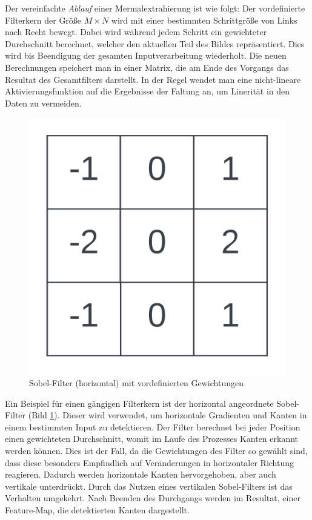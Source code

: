 Der vereinfachte \textit{Ablauf} einer Mermalextrahierung ist wie folgt: Der vordefinierte Filterkern der Größe $M \times N$ wird mit einer bestimmten Schrittgröße von Links nach Recht bewegt. Dabei wird während jedem Schritt ein gewichteter Durchschnitt berechnet, welcher den aktuellen Teil des Bildes repräsentiert. Dies wird bis Beendigung der gesamten Inputverarbeitung wiederholt. Die neuen Berechnungen speichert man in einer Matrix, die am Ende des Vorgangs das Resultat des Gesamtfilters darstellt. In der Regel wendet man eine nicht-lineare Aktivierungsfunktion auf die Ergebnisse der Faltung an, um Linerität in den Daten zu vermeiden.
\begin{figure}[H]
	\centering
	\includegraphics[width=0.2\linewidth]{Bilder/sobelfilter.png}
	\caption{Sobel-Filter (horizontal) mit vordefinierten Gewichtungen}
	\label{img:sobel}
\end{figure}
Ein Beispiel für einen gängigen Filterkern ist der horizontal angeordnete Sobel-Filter (Bild \ref{img:sobel}). Dieser wird verwendet, um horizontale Gradienten und Kanten in einem bestimmten Input zu detektieren. Der Filter berechnet bei jeder Position einen gewichteten Durchschnitt, womit im Laufe des Prozesses Kanten erkannt werden können. Dies ist der Fall, da die Gewichtungen des Filter so gewählt sind, dass diese besonders Empfindlich auf Veränderungen in horizontaler Richtung reagieren. Dadurch werden horizontale Kanten hervorgehoben, aber auch vertikale unterdrückt. Durch das Nutzen eines vertikalen Sobel-Filters ist das Verhalten umgekehrt. Nach Beenden des Durchgangs werden im Resultat, einer Feature-Map, die detektierten Kanten dargestellt.